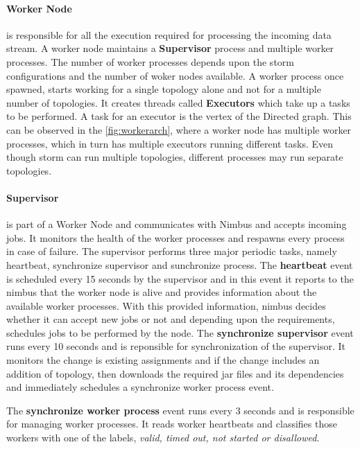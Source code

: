 \documentclass[runningheads,a4paper]{llncs}[2015/06/24]
\begin{document}
\paragraph{Worker Node} is responsible for all the execution required for processing the incoming data stream. A worker node maintains a \textbf{Supervisor} process and multiple worker processes. The number of  worker processes depends upon the storm configurations and the number of woker nodes available. A worker process once spawned, starts working for a single topology alone and not for a multiple number of topologies. It creates threads called \textbf{Executors} which take up a tasks to be performed. A task for an executor is the vertex of the Directed graph. This can be observed in the \ref{fig:workerarch}, where a worker node has multiple worker processes, which in turn has multiple executors running different tasks. 
Even though storm can run multiple topologies, different processes may run separate topologies.

\paragraph{Supervisor} is part of a Worker Node and communicates with Nimbus and accepts incoming jobs. It monitors the health of the worker processes and respawns every process in case of failure. The supervisor performs three major periodic tasks, namely heartbeat, synchronize supervisor and sunchronize process.
The \textbf{heartbeat} event is scheduled every 15 seconds by the supervisor and in this event it reports to the nimbus that the worker node is alive and provides information about the available worker processes.\cite{stormtwitter} With this provided information, nimbus decides whether it can accept new jobs or not and depending upon the requirements, schedules jobs to be performed by the node. The \textbf{synchronize supervisor} event runs every 10 seconds and is reponsible for synchronization of the supervisor. It monitors the change is existing assignments and if the change includes an addition of topology, then downloads the required jar files and its dependencies and immediately schedules a synchronize worker process event.

The \textbf{synchronize worker process} event runs every 3 seconds and is responsible for managing worker processes. It reads worker heartbeats and classifies those workers with one of the labels, \textit{valid, timed out, not started or disallowed}.
\end{document}
